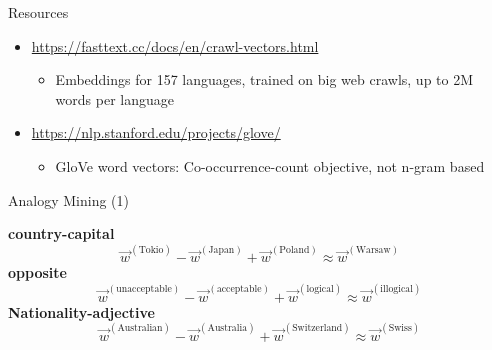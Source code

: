 \begin{vbframe}{Resources}

\vfill

\begin{itemize}
	\item \url{https://fasttext.cc/docs/en/crawl-vectors.html}
		\begin{itemize}
			\item Embeddings for 157 languages, trained on big web crawls, up to 2M words per language
		\end{itemize}
	\item \url{https://nlp.stanford.edu/projects/glove/}
		\begin{itemize}
			\item GloVe word vectors: Co-occurrence-count objective, not n-gram based
		\end{itemize}
\end{itemize}

\vfill

\end{vbframe}


\begin{vbframe}{Analogy Mining (1)}

\vfill

\textbf{country-capital}
$$\vec w^{(\text{Tokio})} - \vec w^{(\text{Japan})} +  \vec w^{(\text{Poland})} \approx \vec w^{(\text{Warsaw})}$$
\textbf{opposite}
$$\vec w^{(\text{unacceptable})} - \vec w^{(\text{acceptable})} +  \vec w^{(\text{logical})} \approx \vec w^{(\text{illogical})}$$
\textbf{Nationality-adjective}
$$\vec w^{(\text{Australian})} - \vec w^{(\text{Australia})} +  \vec w^{(\text{Switzerland})} \approx \vec w^{(\text{Swiss})}$$

\vfill

\end{vbframe}


